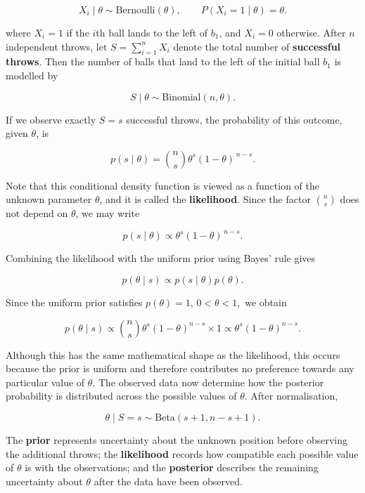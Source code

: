 {\[
X_i \mid \theta \sim \mathrm{Bernoulli}(\theta),
\qquad
P(X_i=1\mid\theta)=\theta.
\]

where $X_i=1$ if the $i$th ball lands to the left of $b_1$, and $X_i=0$
otherwise. After $n$ independent throws, let $S=\sum_{i=1}^{n}X_i$ denote the total number of \textbf{successful throws}. Then the number of balls that land to the left of the initial ball $b_1$ is modelled by

\[
S \mid \theta \sim \mathrm{Binomial}(n,\theta).
\]

If we observe exactly $S = s$ successful throws, the probability of this outcome, given $\theta$, is

\[
p(s\mid\theta)
=
\binom{n}{s}\theta^{s}(1-\theta)^{\,n-s}.
\]

Note that this conditional density function is viewed as a function of the unknown parameter $\theta$, and it is called the \textbf{likelihood}. Since the factor $\binom{n}{s}$ does not depend on $\theta$, we may write

\[
p(s\mid\theta)
\propto
\theta^{s}(1-\theta)^{\,n-s}.
\]

Combining the likelihood with the uniform prior using Bayes' rule gives

\[
p(\theta\mid s)
\propto
p(s\mid\theta)p(\theta).
\]

Since the uniform prior satisfies $p(\theta)=1$, $0<\theta<1,$ we obtain

\[
p(\theta\mid s)
\propto
\binom{n}{s}\theta^s(1-\theta)^{n-s}\times 1
\propto
\theta^s(1-\theta)^{n-s}.
\]

Although this has the same mathematical shape as the likelihood, this occurs
because the prior is uniform and therefore contributes no preference towards
any particular value of $\theta$. The observed data now determine how the
posterior probability is distributed across the possible values of $\theta$.
After normalisation,

\[
\theta\mid S=s
\sim
\mathrm{Beta}(s+1,n-s+1).
\]

The \textbf{prior} represents uncertainty about the unknown position before
observing the additional throws; the \textbf{likelihood} records how compatible
each possible value of $\theta$ is with the observations; and the
\textbf{posterior} describes the remaining uncertainty about $\theta$ after
the data have been observed.

}


